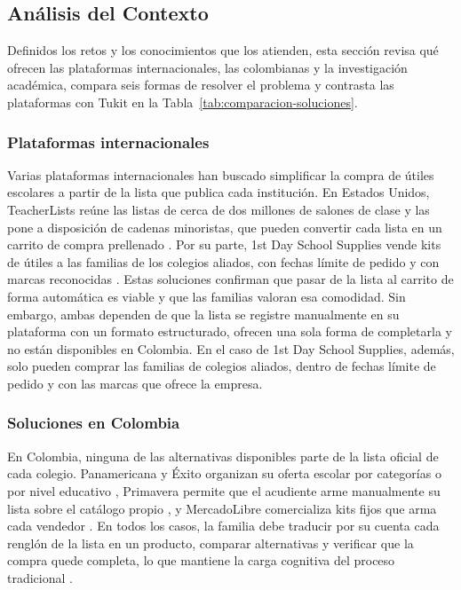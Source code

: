 \subsection{Análisis del Contexto}
\label{sec:analisis-contexto}

Definidos los retos y los conocimientos que los atienden, esta sección revisa qué ofrecen las
plataformas internacionales, las colombianas y la investigación académica, compara seis formas de
resolver el problema y contrasta las plataformas con Tukit en la Tabla~\ref{tab:comparacion-soluciones}.\par

\subsubsection{Plataformas internacionales}

Varias plataformas internacionales han buscado simplificar la compra de útiles
escolares a partir de la lista que publica cada institución. En Estados Unidos, TeacherLists
reúne las listas de cerca de dos millones de salones de clase y las pone a disposición de
cadenas minoristas, que pueden convertir cada lista en un carrito de compra prellenado
\citep{teacherlists_retail_2026}. Por su parte, 1st Day
School Supplies vende kits de útiles a las familias de los colegios aliados, con fechas límite
de pedido y con marcas reconocidas \citep{firstday_faqs_2026}. Estas soluciones confirman
que pasar de la lista al carrito de forma automática es viable y que las familias valoran
esa comodidad. Sin embargo, ambas dependen de que la lista se registre manualmente en su
plataforma con un formato estructurado, ofrecen una sola forma de completarla y no están
disponibles en Colombia. En el caso de 1st Day School Supplies, además, solo pueden
comprar las familias de colegios aliados, dentro de fechas límite de pedido y con las
marcas que ofrece la empresa.\par

\subsubsection{Soluciones en Colombia}

En Colombia, ninguna de las alternativas disponibles parte de la lista oficial de cada colegio.
Panamericana y Éxito organizan su oferta escolar por categorías o por nivel educativo
\citep{panamericana_cotizador_2025,exito_listas_2025}, Primavera permite que el acudiente arme manualmente su
lista sobre el catálogo propio \citep{primavera_armatulista_2026}, y MercadoLibre comercializa kits fijos que
arma cada vendedor \citep{mercadolibre_kits_2025}. En todos los casos, la familia debe traducir por su cuenta
cada renglón de la lista en un producto, comparar alternativas y verificar que la compra quede completa, lo que
mantiene la carga cognitiva del proceso tradicional \citep{sweller_cognitive_2011}.\par


